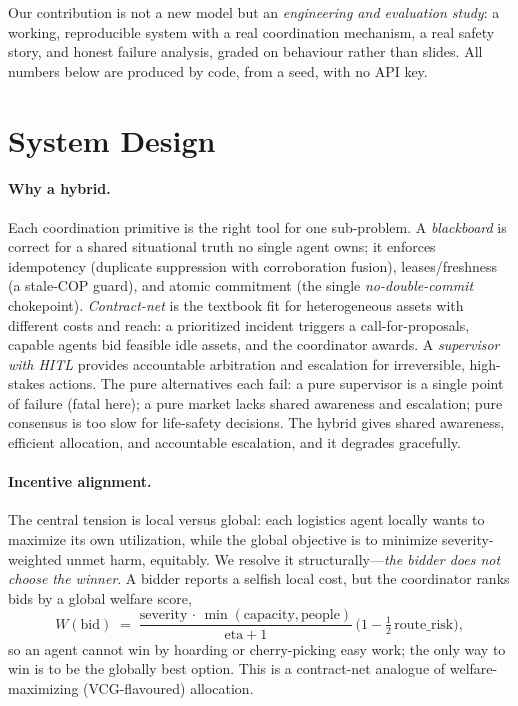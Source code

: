 \documentclass[11pt]{article}
\begin{document}
Our contribution is not a new model but an \emph{engineering and evaluation study}: a working,
reproducible system with a real coordination mechanism, a real safety story, and honest failure analysis,
graded on behaviour rather than slides. All numbers below are produced by code, from a seed, with no API
key.

\section{System Design}
\paragraph{Why a hybrid.} Each coordination primitive is the right tool for one sub-problem. A
\emph{blackboard} is correct for a shared situational truth no single agent owns; it enforces idempotency
(duplicate suppression with corroboration fusion), leases/freshness (a stale-COP guard), and atomic
commitment (the single \emph{no-double-commit} chokepoint). \emph{Contract-net} is the textbook fit for
heterogeneous assets with different costs and reach: a prioritized incident triggers a call-for-proposals,
capable agents bid feasible idle assets, and the coordinator awards. A \emph{supervisor with HITL}
provides accountable arbitration and escalation for irreversible, high-stakes actions. The pure
alternatives each fail: a pure supervisor is a single point of failure (fatal here); a pure market lacks
shared awareness and escalation; pure consensus is too slow for life-safety decisions. The hybrid gives
shared awareness, efficient allocation, and accountable escalation, and it degrades gracefully.

\paragraph{Incentive alignment.} The central tension is local versus global: each logistics agent locally
wants to maximize its own utilization, while the global objective is to minimize severity-weighted unmet
harm, equitably. We resolve it structurally---\emph{the bidder does not choose the winner}. A bidder
reports a selfish local cost, but the coordinator ranks bids by a global welfare score,
\begin{equation}
W(\text{bid}) \;=\; \frac{\text{severity}\,\cdot\,\min(\text{capacity}, \text{people})}
{\text{eta}+1}\,\bigl(1 - \tfrac{1}{2}\,\text{route\_risk}\bigr),
\end{equation}
so an agent cannot win by hoarding or cherry-picking easy work; the only way to win is to be the globally
best option. This is a contract-net analogue of welfare-maximizing (VCG-flavoured) allocation.
\end{document}

